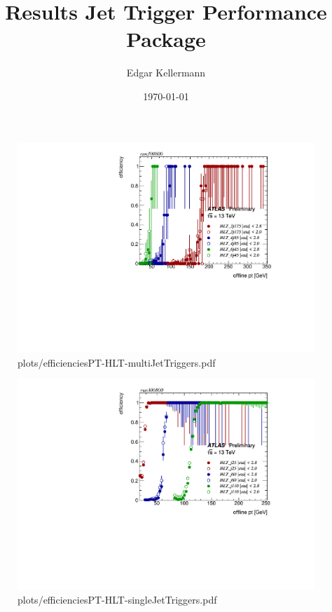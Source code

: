 \documentclass{beamer}
\begin{document}
\title{Results Jet Trigger Performance Package}
\author{Edgar Kellermann}
\date{\today}

\begin{frame}
  \titlepage
\end{frame}
\begin{frame}
    \begin{figure}[h]
      \centering
      \includegraphics[scale=0.50]{plots/efficienciesPT-HLT-multiJetTriggers.pdf}
      \caption{plots/efficienciesPT-HLT-multiJetTriggers.pdf}
      \label{img:1}
    \end{figure}
\end{frame}
\begin{frame}
    \begin{figure}[h]
      \centering
      \includegraphics[scale=0.50]{plots/efficienciesPT-HLT-singleJetTriggers.pdf}
      \caption{plots/efficienciesPT-HLT-singleJetTriggers.pdf}
      \label{img:1}
    \end{figure}
\end{frame}
\end{document}
